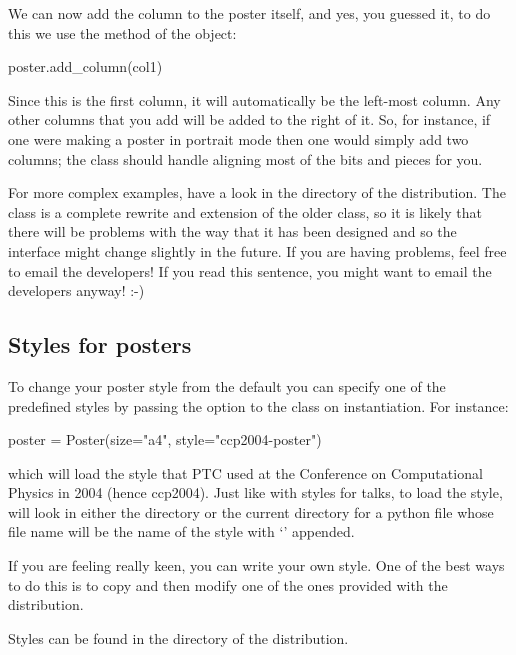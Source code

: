 We can now add the column to the poster itself, and yes, you guessed it, to
do this we use the  method of the  object:
\begin{python}
poster.add_column(col1)
\end{python}
Since this is the first column, it will automatically be the left-most
column.  Any other columns that you add will be added to the right of it.
So, for instance, if one were making a poster in portrait mode then one
would simply add two columns; the  class should handle
aligning most of the bits and pieces for you.

For more complex examples, have a look in the  directory of
the \pyscript distribution.  The  class is a complete rewrite
and extension of the older  class, so it is likely that
there will be problems with the way that it has been designed and so the
interface might change slightly in the future.  If you are having problems,
feel free to email the developers!  If you read this sentence, you might
want to email the developers anyway!  :-)

\subsection{Styles for posters}
\label{sec:poster-styles}

To change your poster style from the default you can specify one of the
predefined styles by passing the  option to the 
class on instantiation.  For instance:
\begin{python}
poster = Poster(size="a4", style="ccp2004-poster")
\end{python}
which will load the style that PTC used at the Conference on Computational
Physics in 2004 (hence ccp2004).  Just like with styles for talks, to load
the style, \pyscript will look in either the 
directory or the current directory for a python file whose file name will be
the name of the style with `' appended.

If you are feeling really keen, you can write your own style.  One of the
best ways to do this is to copy and then modify one of the ones provided
with the \pyscript distribution.

Styles can be found in the  directory of the \pyscript
distribution.
